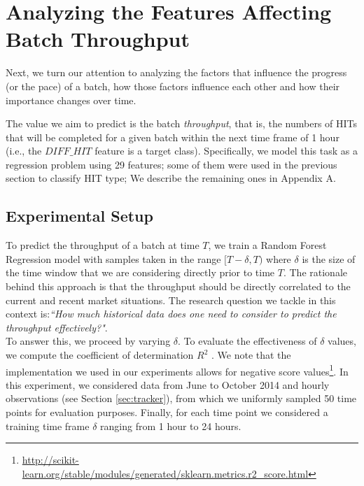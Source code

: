\section{Analyzing the Features Affecting Batch Throughput}
\label{sec:throughput}
Next, we turn our attention to analyzing the factors that influence the progress (or the pace) of a batch, how those factors influence each other and how their importance changes over time. 

The value we aim to predict is the batch \emph{throughput}, that is, the numbers of HITs that  will be completed for a given batch within the next time frame of 1 hour (i.e.,  the $DIFF\_HIT$ feature is a target class).
Specifically, we model this task as a regression problem using 29 features; some of them were used in the previous section to classify HIT type; We describe the remaining ones in Appendix A.

\subsection{Experimental Setup}

To predict the throughput of a batch at time $T$, we train a Random Forest Regression model with samples taken in the range $[T-\delta, T)$ where $\delta$ is the size of the time window that we are   considering directly prior to time $T$. The rationale behind this approach is that the throughput should be directly correlated to the current and recent market situations. 
The research question we tackle in this context is:\emph{``How much historical data does one need to consider to predict the throughput effectively?"}. \\ To answer this, we proceed by varying $\delta$.
To evaluate the effectiveness of $\delta$ values, we compute the coefficient of determination $R^2$ \cite{sklearnweb, sklearn}. We note that the implementation we used in our experiments allows for negative score values\footnote{\url{http://scikit-learn.org/stable/modules/generated/sklearn.metrics.r2_score.html}}.
In this experiment, we considered  data from June to October 2014 and hourly observations (see Section \ref{sec:tracker}), from which we uniformly sampled 50 time points for evaluation purposes. Finally, for each time point we considered a training time frame $\delta$ ranging from 1 hour to 24 hours. 


